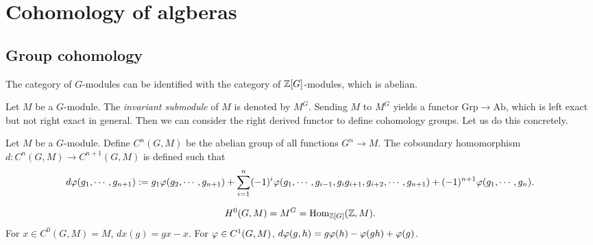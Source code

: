 \documentclass{../../large}
\begin{document}
\chapter{Cohomology of algberas}

\section{Group cohomology}

The category of $G$-modules can be identified with the category of $\mathbb{Z}[G]$-modules, which is abelian.


Let $M$ be a $G$-module.
The \emph{invariant submodule} of $M$ is denoted by $M^G$.
Sending $M$ to $M^G$ yields a functor $\mathrm{Grp}\to\mathrm{Ab}$, which is left exact but not right exact in general.
Then we can consider the right derived functor to define cohomology groups.
Let us do this concretely.


Let $M$ be a $G$-module.
Define $C^n(G,M)$ be the abelian group of all functions $G^n\to M$.
The coboundary homomorphism $d:C^n(G,M)\to C^{n+1}(G,M)$ is defined such that
\[d\varphi(g_1,\cdots,g_{n+1}):=g_1\varphi(g_2,\cdots,g_{n+1})+\sum_{i=1}^n(-1)^i\varphi(g_1,\cdots,g_{i-1},g_ig_{i+1},g_{i+2},\cdots,g_{n+1})+(-1)^{n+1}\varphi(g_1,\cdots,g_n).\]

\[H^0(G,M)=M^G=\operatorname{Hom}_{\mathbb{Z}[G]}(\mathbb{Z},M).\]
For $x\in C^0(G,M)=M$, $dx(g)=gx-x$.
For $\varphi\in C^1(G,M)$, $d\varphi(g,h)=g\varphi(h)-\varphi(gh)+\varphi(g)$.
\end{document}
